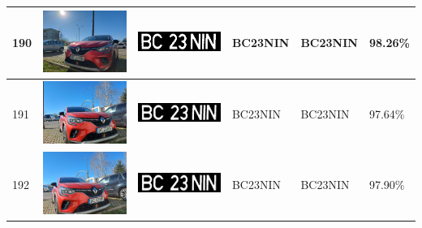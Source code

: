 \documentclass[a4paper,12pt]{report}
\begin{document}
\begin{longtable}{| m{0.6cm} | m{3cm} | m{3cm} | m{1.8cm} | m{1.8cm} | m{1.8cm} |}
        190 & \includegraphics[width=3cm,keepaspectratio]{dataset/118_d1.jpg} & \includegraphics[width=3cm,keepaspectratio]{segmentari/190.jpg} & BC23NIN & BC23NIN & 98.26\% \\ \hline
        191 & \includegraphics[width=3cm,keepaspectratio]{dataset/118_s1.jpg} & \includegraphics[width=3cm,keepaspectratio]{segmentari/191.jpg} & BC23NIN & BC23NIN & 97.64\% \\ \hline
        192 & \includegraphics[width=3cm,keepaspectratio]{dataset/118_s2.jpg} & \includegraphics[width=3cm,keepaspectratio]{segmentari/192.jpg} & BC23NIN & BC23NIN & 97.90\% \\ \hline
        \end{longtable}
\end{document}
